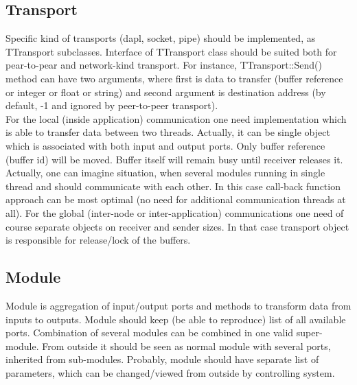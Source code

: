 \subsection{Transport}
Specific kind of transports (dapl, socket, pipe) should be implemented, as TTransport subclasses. Interface of TTransport class should be suited both for pear-to-pear and network-kind transport. For instance, TTransport::Send() method can have two arguments, where first is data to transfer (buffer reference or integer or float or string) and second argument is destination address (by default, -1 and ignored by peer-to-peer transport). \\
For the local (inside application) communication one need implementation which is able to transfer data between two threads. Actually, it can be single object which is associated with both input and output ports. Only buffer reference (buffer id) will be moved. Buffer itself will remain busy until receiver releases it. Actually, one can imagine situation, when several modules running in single thread and should communicate with each other. In this case call-back function approach can be most optimal (no need for additional communication threads at all).
For the global (inter-node or inter-application) communications one need of course separate objects on receiver and sender sizes. In that case transport object is responsible for release/lock of the buffers. 

\subsection{Module}
Module is aggregation of input/output ports and methods to transform data from inputs to outputs. Module should keep (be able to reproduce) list of all available ports.
Combination of several modules can be combined in one valid super-module. From outside it should be seen as normal module with several ports, inherited from sub-modules.
Probably, module should have separate list of parameters, which can be changed/viewed from outside by controlling system. 

